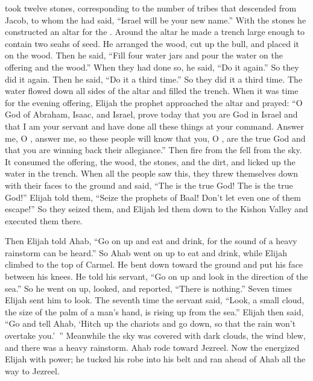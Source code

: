 {took
twelve
stones,
corresponding to the number
of tribes
that descended
from Jacob,
to whom
the {}
had said,
“Israel
will be
your new name.”
With
the stones
he constructed
an altar
for
the {}. Around
the altar
he made
a trench
large enough to contain
two seahs
of seed.
He arranged
the wood,
cut
up the bull,
and placed
it on
the wood.
Then he said, “Fill four water jars and pour the water on the offering and the wood.” When they had done so, he said,
“Do it again.”
So they did it again.
Then he said,
“Do it a third
time.” So they did it a third time.
The water
flowed down
all sides
of the altar
and filled
the trench.
When
it was time for the evening
offering,
Elijah
the prophet
approached
the altar and prayed: “O
{}
God
of Abraham,
Isaac,
and Israel,
prove
today
that
you
are God
in Israel
and that I am
your servant
and have done
all
these
things
at your command.
Answer
me, O
{}, answer
me, so these
people
will know
that
you,
O
{}, are the true God
and that you
are winning back their allegiance.”
Then fire
from the
{}
fell
from the sky. It consumed
the offering,
the wood,
the stones,
and the dirt,
and licked up
the water
in the trench.
When
all
the people
saw this, they threw
themselves down with their faces
to the ground and said,
“The
{}
is the true God! The
{}
is the true God!”
Elijah
told
them, “Seize
the prophets
of Baal! Don’t
let even one
of them escape!” So they
seized
them, and Elijah
led them down
to
the Kishon
Valley
and executed
them there.
\par }{\PP {}Then Elijah
told Ahab,
“Go on up
and eat
and drink,
for
the sound
of a heavy
rainstorm can be heard.”
So Ahab
went on up
to eat
and drink,
while Elijah
climbed
to
the top
of Carmel.
He bent
down toward the ground
and put
his face
between
his knees.
He told
his servant,
“Go on up
and look
in the direction
of the sea.”
So he went on up,
looked,
and reported,
“There is
nothing.”
Seven
times Elijah sent him to look.
The seventh
time the servant said,
“Look,
a small
cloud,
the size of the palm of a man’s
hand,
is rising up
from the sea.”
Elijah then said,
“Go
and tell
Ahab,
‘Hitch up
the chariots and go down,
so that the rain
won’t
overtake you.’ ”
Meanwhile
the sky
was covered with dark
clouds,
the wind
blew, and there was
a heavy rainstorm.
Ahab
rode
toward Jezreel.
Now
the {}
energized
Elijah
with power; he tucked
his robe into his belt
and ran
ahead
of Ahab
all the way
to Jezreel.

}
